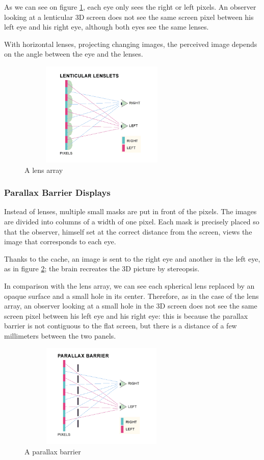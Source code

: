 As we can see on figure \ref{fig:lenticular}, each eye only sees the right or left pixels. An observer looking at a lenticular 3D screen does not see the same screen pixel between his left eye and his right eye, although both eyes see the same lenses.

With horizontal lenses, projecting changing images, the perceived image depends on the angle between the eye and the lenses.

\begin{figure}[h!]
\centering
\includegraphics[width=8cm,height=5cm]{image/lentuc.png}
\caption{A lens array}

\label{fig:lenticular}
\end{figure}

\subsubsection{Parallax Barrier Displays}
Instead of lenses, multiple small masks are put in front of the pixels. The images are divided into columns of a width of one pixel.
Each mask is precisely placed so that the observer, himself set at the correct distance from the screen, views the image that corresponds to each eye. 

Thanks to the cache, an image is sent to the right eye and another in the left eye, as in figure \ref{fig:paraba}; the brain recreates the 3D picture by stereopsis.

In comparison with the lens array, we can see each spherical lens replaced by an opaque surface and a small hole in its center. Therefore, as in the case of the lens array, an observer looking at a small hole in the 3D screen does not see the same screen pixel between his left eye and his right eye: this is because the parallax barrier is not contiguous to the flat screen, but there is a distance of a few millimeters between the two panels.
\clearpage

\begin{figure}[h!]
\centering\includegraphics[width=8cm,height=5cm]{image/parallax.png}
\caption{A parallax barrier}
\label{fig:paraba}
\end{figure}

